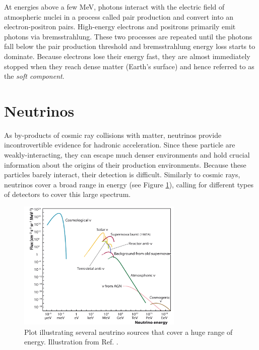 At energies above a few MeV, photons interact with the electric field of atmospheric nuclei in a process called pair production and convert into an electron-positron pairs. High-energy electrons and positrons primarily emit photons via bremsstrahlung. These two processes are repeated until the photons fall below the pair production threshold and bremsstrahlung energy loss starts to dominate. Because electrons lose their energy fast, they are almost immediately stopped when they reach dense matter (Earth's surface) and hence referred to as the \textit{soft component}.


\section{Neutrinos}
\label{sec:neutrinos}
As by-products of cosmic ray collisions with matter, neutrinos provide incontrovertible evidence for hadronic acceleration. Since these particle are weakly-interacting, they can escape much denser environments and hold crucial information about the origins of their production environments. Because these particles barely interact, their detection is difficult. Similarly to cosmic rays, neutrinos cover a broad range in energy (see Figure \ref{fig:neutrinospectrumall}), calling for different types of detectors to cover this large spectrum. 

\begin{figure}[t]
\centering
\includegraphics[width=0.7\textwidth]{chapter3/img/neutrinospectrum.png}
\caption{Plot illustrating several neutrino sources that cover a huge range of energy. Illustration from Ref. \cite{Katz:2011ke}.}
\label{fig:neutrinospectrumall}
\end{figure}

